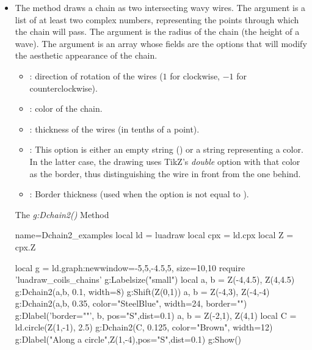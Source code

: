 \begin{itemize}
    \item The  method draws a chain as two intersecting wavy wires. The  argument is a list of at least two complex numbers, representing the points through which the chain will pass. The  argument is the radius of the chain (the height of a wave). The  argument is an array whose fields are the options that will modify the aesthetic appearance of the chain.
    \begin{itemize}
        \item {}: direction of rotation of the wires ($1$ for clockwise, $-1$ for counterclockwise).
        \item {}: color of the chain.
        \item {}: thickness of the wires (in tenths of a point).
        \item {}: This option is either an empty string () or a string representing a color. In the latter case, the drawing uses TikZ's \emph{double} option with that color as the border, thus distinguishing the wire in front from the one behind.
        \item {}: Border thickness (used when the  option is not equal to \nil).
        \end{itemize}

\begin{demo}{The \emph{g:Dchain2()} Method}
\begin{luadraw}{name=Dchain2_examples}
local ld = luadraw
local cpx = ld.cpx
local Z = cpx.Z

local g = ld.graph:new{window={-5,5,-4.5,5}, size={10,10}}
require 'luadraw_coils_chains'
g:Labelsize("small")
local a, b = Z(-4,4.5), Z(4,4.5)
g:Dchain2({a,b}, 0.1, {width=8})
g:Shift(Z(0,1))
a, b = Z(-4,3), Z(-4,-4)
g:Dchain2({a,b}, 0.35, {color="SteelBlue", width=24, border=""})
g:Dlabel('border=""', b, {pos="S",dist=0.1})
a, b = Z(-2,1), Z(4,1)
local C = ld.circle(Z(1,-1), 2.5)
g:Dchain2(C, 0.125, {color="Brown", width=12})
g:Dlabel("Along a circle",Z(1,-4),{pos="S",dist=0.1})
g:Show()
\end{luadraw} 
\end{demo}
\end{itemize}

